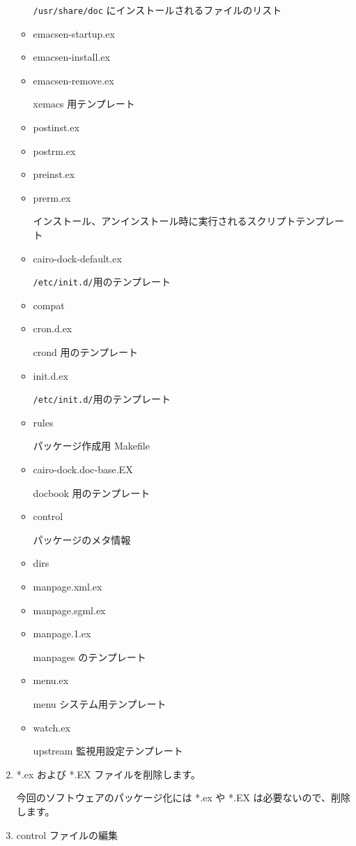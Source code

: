 \documentclass[mingoth,a4paper]{jsarticle}
\begin{document}
\begin{enumerate}
\begin{itemize}
				\texttt{/usr/share/doc} にインストールされるファイルのリスト
			\item emacsen-startup.ex
			\item emacsen-install.ex
			\item emacsen-remove.ex
       
 				xemacs 用テンプレート
			\item postinst.ex
			\item postrm.ex
			\item preinst.ex         
			\item prerm.ex

				インストール、アンインストール時に実行されるスクリプトテンプレート
			\item cairo-dock-default.ex
  
				\texttt{/etc/init.d/}用のテンプレート

			\item compat     
			\item cron.d.ex
  
				crond 用のテンプレート
			\item init.d.ex
           
				\texttt{/etc/init.d/}用のテンプレート
			\item rules

				パッケージ作成用 Makefile
			\item cairo-dock.doc-base.EX  

				docbook 用のテンプレート
			\item control
    
				パッケージのメタ情報
			\item dirs
			\item manpage.xml.ex 
			\item manpage.sgml.ex       
			\item manpage.1.ex
        
				manpages のテンプレート
			\item menu.ex
          
				menu システム用テンプレート
			\item watch.ex

				upstream 監視用設定テンプレート
		\end{itemize}
		
		
	\item *.ex および *.EX ファイルを削除します。

		今回のソフトウェアのパッケージ化には *.ex や *.EX は必要ないので、削除します。
 
	\item control ファイルの編集


\end{enumerate}
\end{document}
